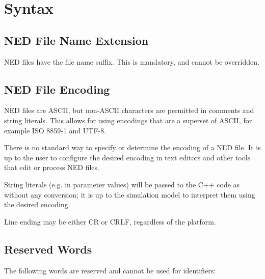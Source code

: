 \label{cha:ned-ref}

\section{Syntax}
\label{sec:ned-ref:syntax}

\subsection{NED File Name Extension}
\label{sec:ned-ref:ned-file-name-extension}

NED files have the  file name suffix. This is mandatory, and
cannot be overridden.

\subsection{NED File Encoding}
\label{sec:ned-ref:ned-file-encoding}

NED files are ASCII, but non-ASCII characters are permitted in comments
and string literals. This allows for using encodings that are a superset
of ASCII, for example ISO 8859-1 and UTF-8.

\begin{note}
    There is no standard way to specify or determine the encoding of a NED file.
    It is up to the user to configure the desired encoding in text editors
    and other tools that edit or process NED files.
\end{note}

String literals (e.g. in parameter values) will be passed to the C++ code
as  without any conversion; it is up to the simulation model
to interpret them using the desired encoding.

Line ending may be either CR or CRLF, regardless of the platform.


\subsection{Reserved Words}
\label{sec:ned-ref:reserved-words}

The following words are reserved and cannot be used for identifiers:




